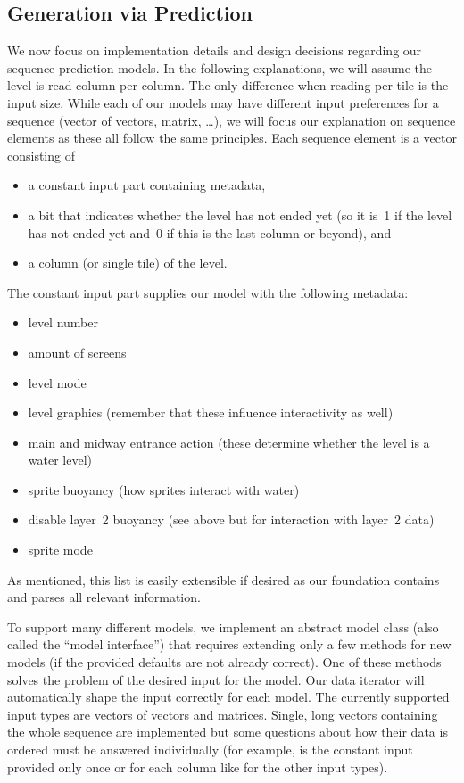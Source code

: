 \subsection{Generation via Prediction}
\label{sec:generation-via-prediction}

We now focus on implementation details and design decisions regarding
our sequence prediction models. In the following explanations, we will
assume the level is read column per column. The only difference when
reading per tile is the input size. While each of our models may have
different input preferences for a sequence (vector of vectors, matrix,
\dots), we will focus our explanation on sequence elements as these
all follow the same principles. Each sequence element is a vector
consisting of
\begin{itemize}
\item a constant input part containing metadata,
\item a bit that indicates whether the level has not ended yet (so it
  is~1 if the level has not ended yet and~0 if this is the last column
  or beyond), and
\item a column (or single tile) of the level.
\end{itemize}
The constant input part supplies our model with the following
metadata:
\begin{itemize}
\item level number
\item amount of screens
\item level mode
\item level graphics (remember that these influence interactivity as well)
\item main and midway entrance action (these determine whether the
  level is a water level)
\item sprite buoyancy (how sprites interact with water)
\item disable layer~2 buoyancy (see above but for interaction with layer~2 data)
\item sprite mode
\end{itemize}
As mentioned, this list is easily extensible if desired as our
foundation contains and parses all relevant information.

To support many different models, we implement an abstract model class
(also called the ``model interface'') that requires extending only a
few methods for new models (if the provided defaults are not already
correct). One of these methods solves the problem of the desired input
for the model. Our data iterator will automatically shape the input
correctly for each model. The currently supported input types are
vectors of vectors and matrices. Single, long vectors containing the
whole sequence are implemented but some questions about how their data
is ordered must be answered individually (for example, is the constant
input provided only once or for each column like for the other input
types).

